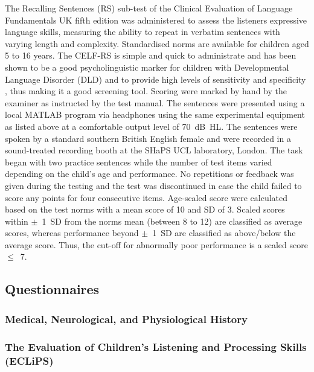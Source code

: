 \documentclass[a4paper, twoside]{templates/ociamthesis}
\begin{document}
The Recalling Sentences (RS) sub-test of the Clinical Evaluation of Language Fundamentals UK fifth edition \autocite[CELF-5-UK][]{HWiig2017} was administered to assess the listeners expressive language skills, measuring the ability to repeat in verbatim sentences with varying length and complexity. Standardised norms are available for children aged 5 to 16 years. The CELF-RS is simple and quick to administrate and has been shown to be a good psycholinguistic marker for children with Developmental Language Disorder (DLD) and to provide high levels of sensitivity and specificity \autocite{Conti-Ramsden2001}, thus making it a good screening tool. Scoring were marked by hand by the examiner as instructed by the test manual. The sentences were presented using a local MATLAB program via headphones using the same experimental equipment as listed above at a comfortable output level of 70~dB~HL. The sentences were spoken by a standard southern British English female and were recorded in a sound-treated recording booth at the SHaPS UCL laboratory, London. The task began with two practice sentences while the number of test items varied depending on the child's age and performance. No repetitions or feedback was given during the testing and the test was discontinued in case the child failed to score any points for four consecutive items. Age-scaled score were calculated based on the test norms with a mean score of 10 and SD of 3. Scaled scores within \(\pm\)~1~SD from the norms mean (between 8 to 12) are classified as average scores, whereas performance beyond \(\pm\)~1~SD are classified as above/below the average score. Thus, the cut-off for abnormally poor performance is a scaled score \(\leq\)~7.

\hypertarget{questionnaires}{%
\subsection{Questionnaires}\label{questionnaires}}

\hypertarget{medical-neurological-and-physiological-history}{%
\subsubsection*{Medical, Neurological, and Physiological History}\label{medical-neurological-and-physiological-history}}

\hypertarget{the-evaluation-of-childrens-listening-and-processing-skills-eclips}{%
\subsubsection*{The Evaluation of Children's Listening and Processing Skills (ECLiPS)}\label{the-evaluation-of-childrens-listening-and-processing-skills-eclips}}
\end{document}
